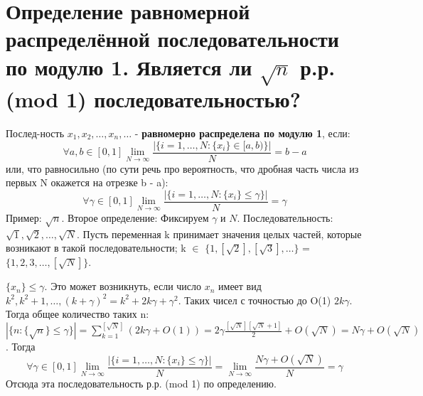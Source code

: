 \setcounter{section}{34}
\section{Определение равномерной распределённой последовательности по модулю 1. Является ли $\sqrt{n}$ р.р. (mod 1) последовательностью?}

Послед-ность $x_1, x_2, \dots, x_n, \dots$ - \textbf{равномерно распределена по модулю 1}, если:
\[ \forall a, b \in [0, 1] \lim_{N \to \infty} \frac{|\{i = 1, \dots, N: \{x_i\} \in [a, b)\}|}{N} = b - a \]
или, что равносильно (по сути речь про вероятность, что дробная часть числа из первых N окажется на отрезке b - a):
\[ \forall \gamma \in [0, 1] \lim_{N \to \infty} \frac{|\{i = 1, \dots, N: \{x_i\} \leqslant \gamma \}|}{N} = \gamma \]
Пример: $\sqrt{n}$.
Второе определение: Фиксируем $\gamma$ и $N$. Последовательность: $\sqrt{1}, \sqrt{2}, \dots, \sqrt{N}$. Пусть переменная k принимает значения целых частей, которые возникают в такой последовательности; k $\in$ $\{ 1, [\sqrt{2}], [\sqrt{3}], \dots \}$ = $\{ 1, 2, 3, \dots, [\sqrt{N}] \}$. \par
$\{ x_n \} \leqslant \gamma$. Это может возникнуть, если число $x_n$ имеет вид $k^2, k^2+1, \dots, (k + \gamma)^2 = k^2 + 2k\gamma + \gamma^2$. Таких чисел с точностью до O(1) $2k\gamma$. Тогда общее количество таких n: $|\{n: \{ \sqrt{n} \} \leqslant \gamma\}| = \sum_{k = 1}^{[\sqrt{N}]} (2k\gamma + O(1)) = 2\gamma \frac{[\sqrt{N}][\sqrt{N} + 1]}{2} + O(\sqrt{N}) = N\gamma + O(\sqrt{N})$. Тогда \[ \forall \gamma \in [0, 1] \lim_{N \to \infty} \frac{|\{i = 1, \dots, N: \{x_i\} \leqslant \gamma \}|}{N} = \lim_{N \to \infty} \frac{N\gamma + O(\sqrt{N})}{N} = \gamma \]
Отсюда эта последовательность р.р. (mod 1) по определению.